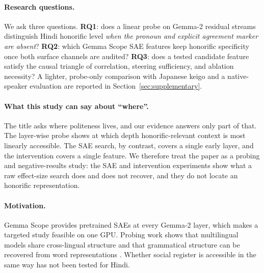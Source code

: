 \documentclass[11pt]{article}
\begin{document}
\paragraph{Research questions.} We ask three questions.
\textbf{RQ1}: does a linear probe on Gemma-2 residual streams distinguish
Hindi honorific level \emph{when the pronoun and explicit agreement marker are
absent}? \textbf{RQ2}: which Gemma Scope SAE features keep honorific
specificity once both surface channels are audited? \textbf{RQ3}: does a
tested candidate feature satisfy the causal triangle of correlation, steering
sufficiency, and ablation necessity? A lighter, probe-only comparison with
Japanese keigo and a native-speaker evaluation are reported in
Section~\ref{sec:supplementary}.

\paragraph{What this study can say about ``where''.}
The title asks where politeness lives, and our evidence answers only part of
that. The layer-wise probe shows at which depth honorific-relevant context is
most linearly accessible. The SAE search, by contrast, covers a single early
layer, and the intervention covers a single feature. We therefore treat the
paper as a probing and negative-results study: the SAE and intervention
experiments show what a raw effect-size search does and does not recover, and
they do not locate an honorific representation.

\paragraph{Motivation.}
Gemma Scope \citep{lieberum2024gemmascope} provides pretrained SAEs at every
Gemma-2 layer, which makes a targeted study feasible on one GPU. Probing work
shows that multilingual models share cross-lingual structure
\citep{pires2019multilingual} and that grammatical structure can be recovered
from word representations \citep{hewitt2019structural}. Whether social register
is accessible in the same way has not been tested for Hindi.
\end{document}
